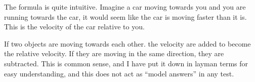 The formula is quite intuitive. Imagine a car moving towards you and you are running towards the car, it would seem like the car is moving faster than it is. This is the velocity of the car relative to you.

If two objects are moving towards each other. the velocity are added to become the relative velocity. If they are moving in the same direction, they are subtracted. This is common sense, and I have put it down in layman terms for easy understanding, and this does not act as ``model answers'' in any test.